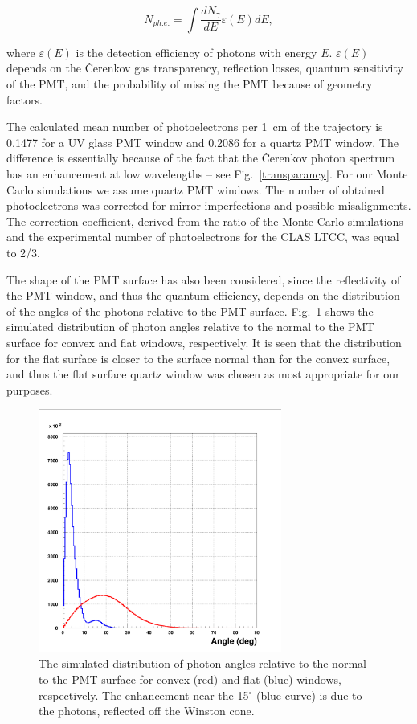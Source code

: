 \begin{equation}
N_{ph.e.} = \int {}{}  \frac{dN_\gamma} {dE} \varepsilon(E)dE,
\end{equation}

\noindent
where $\varepsilon(E)$ is the detection efficiency of photons with energy 
$E$.  $\varepsilon(E)$ depends on the {\v C}erenkov gas transparency, 
reflection losses, quantum sensitivity of the PMT, and the probability of
missing the PMT because of geometry factors.  

The calculated mean number of photoelectrons per 1~cm of the trajectory is 
0.1477 for a UV glass PMT window and 0.2086 for a quartz PMT window.  The 
difference is essentially because of the fact that the {\v C}erenkov photon 
spectrum has an enhancement at low wavelengths -- see 
Fig.~\ref{transparancy}.  For our Monte Carlo simulations we assume quartz 
PMT windows.  The number of obtained photoelectrons was corrected for 
mirror imperfections and possible misalignments.  The correction 
coefficient, derived from the ratio of the Monte Carlo simulations and 
the experimental number of photoelectrons for the CLAS LTCC, was equal to 
2/3.

The shape of the PMT surface has also been considered, since the 
reflectivity of the PMT window, and thus the quantum efficiency, depends 
on the distribution of the angles of the photons relative to the PMT 
surface.   Fig.~\ref{angles} shows the simulated distribution of photon 
angles relative to the normal to the PMT surface for convex and flat 
windows, respectively.  It is seen that the distribution for the flat 
surface is closer to the surface normal than for the convex surface, and 
thus the flat surface quartz window was chosen as most appropriate for our 
purposes.

\begin{figure}[htbp]
\centering
\includegraphics[height=8cm,angle=0]{MC-simulation/angles.eps}
\caption{\small{The simulated distribution of photon angles relative to 
the normal to the PMT surface for convex (red) and flat (blue) windows, 
respectively. The enhancement near the 15$^\circ$ (blue curve) is due to 
the photons, reflected off the Winston cone.}}
\label{angles}
\end{figure}

